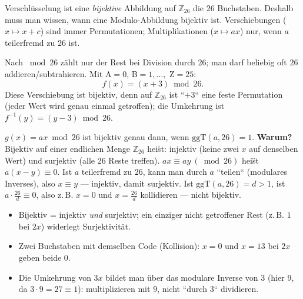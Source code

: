 


Verschl\"usselung ist eine \emph{bijektive} Abbildung auf $\mathbb Z_{26}$
die 26 Buchstaben. Deshalb muss man wissen, wann eine Modulo-Abbildung
bijektiv ist. Verschiebungen ($x\mapsto x+c$) sind immer Permutationen;
Multiplikationen ($x\mapsto ax$) nur, wenn $a$ teilerfremd zu $26$ ist.

\begin{werkzeugkasten}
Nach $\bmod 26$ z\"ahlt nur der Rest bei Division durch $26$; man darf
beliebig oft $26$ addieren/subtrahieren. Mit A$=0$, B$=1,\dots,$ Z$=25$:
\begin{equation}
  f(x)=(x+3)\bmod 26 .
\end{equation}
Diese Verschiebung ist bijektiv, denn auf $\mathbb Z_{26}$ ist ``$+3$``
eine feste Permutation (jeder Wert wird genau einmal getroffen); die
Umkehrung ist $f^{-1}(y)=(y-3)\bmod26$.
\end{werkzeugkasten}

\begin{werkzeugkasten}
$g(x)=ax\bmod26$ ist bijektiv genau dann, wenn $\mathrm{ggT}(a,26)=1$.
\textbf{Warum?} Bijektiv auf einer endlichen Menge $\mathbb Z_{26}$
hei\"st: injektiv (keine zwei $x$ auf denselben Wert) und surjektiv (alle
26 Reste treffen). $ax\equiv ay\ (\bmod 26)$ hei\"st $a(x-y)\equiv0$.
Ist $a$ teilerfremd zu $26$, kann man durch $a$ ``teilen`` (modulares
Inverses), also $x\equiv y$ --- injektiv, damit surjektiv. Ist
$\mathrm{ggT}(a,26)=d>1$, ist $a\cdot\frac{26}{d}\equiv0$, also z.\,B.
$x=0$ und $x=\frac{26}{d}$ kollidieren --- nicht bijektiv.
\end{werkzeugkasten}

\begin{achtung}
\begin{itemize}
  \item Bijektiv = injektiv \emph{und} surjektiv; ein einziger nicht
        getroffener Rest (z.\,B. $1$ bei $2x$) widerlegt Surjektivität.
  \item Zwei Buchstaben mit demselben Code (Kollision): $x=0$ und
        $x=13$ bei $2x$ geben beide $0$.
  \item Die Umkehrung von $3x$ bildet man \"uber das modulare Inverse von
        $3$ (hier $9$, da $3\cdot9=27\equiv1$): multiplizieren mit $9$,
        nicht ``durch $3$`` dividieren.
\end{itemize}
\end{achtung}
